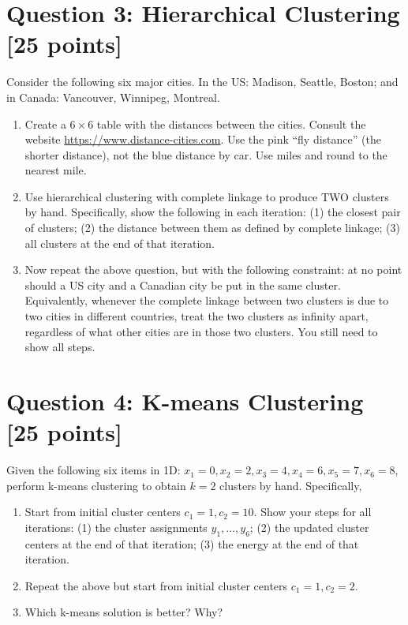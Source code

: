 \documentclass{article}
\begin{document}
\section*{Question 3: Hierarchical Clustering [25 points]}
Consider the following six major cities. In the US: Madison, Seattle, Boston; and in Canada: Vancouver, Winnipeg, Montreal.
\begin{enumerate}
\item 
Create a $6 \times 6$ table with the distances between the cities.  
Consult the website \url{https://www.distance-cities.com}.  Use the pink ``fly distance'' (the shorter distance), not the blue distance by car.  Use miles and round to the nearest mile.
\item Use hierarchical clustering with complete linkage to produce TWO clusters by hand.  Specifically, show the following in each iteration: (1) the closest pair of clusters; (2) the distance between them as defined by complete linkage; (3) all clusters at the end of that iteration.
\item Now repeat the above question, but with the following constraint: at no point should a US city and a Canadian city be put in the same cluster.  Equivalently, whenever the complete linkage between two clusters is due to two cities in different countries, treat the two clusters as infinity apart, regardless of what other cities are in those two clusters.
You still need to show all steps.
\end{enumerate}


\section*{Question 4: K-means Clustering [25 points]}
Given the following six items in 1D: $x_1=0, x_2=2, x_3=4, x_4=6, x_5=7, x_6=8$, perform k-means clustering to obtain $k=2$ clusters by hand.
Specifically,
\begin{enumerate}
\item Start from initial cluster centers $c_1=1, c_2=10$.  Show your steps for all iterations: (1) the cluster assignments $y_1, \ldots, y_6$; (2) the updated cluster centers at the end of that iteration; (3) the energy at the end of that iteration.
\item Repeat the above but start from initial cluster centers $c_1=1, c_2=2$.
\item Which k-means solution is better?  Why?
\end{enumerate}
\end{document}
